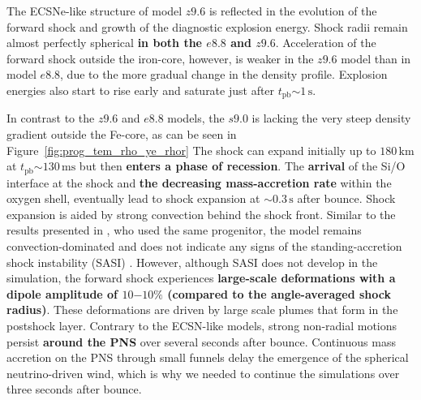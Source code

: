 \documentclass[fleqn,usenatbib]{mnras}
\newcommand{\tpb}{\ensuremath{t_{\text{pb}}}}
\newcommand{\km}{\ensuremath{\mathrm{km}}}
\newcommand{\s}{\ensuremath{\text{s}}}
\newcommand{\ms}{\ensuremath{\text{ms}}}
\begin{document}
The ECSNe-like structure of model $z9.6$ is reflected in the evolution of the forward shock and growth of the diagnostic explosion energy. Shock radii remain almost perfectly spherical \textbf{in both the $e8.8$ and $z9.6$}. Acceleration of the forward shock outside the iron-core, however, is weaker in the $z9.6$ model than in model $e8.8$, due to the more gradual change in the density profile. Explosion energies also start to rise early and saturate just after $\tpb\mathord{\sim}1\,\s$.

In contrast to the $z9.6$ and $e8.8$ models, the $s9.0$ is lacking the very steep density gradient outside the Fe-core, as can be seen in Figure~\ref{fig:prog_tem_rho_ye_rhor}
The shock can expand initially up to $180\,\km$ at $\tpb\mathord{\sim}130\,\ms$ but then \textbf{enters a phase of recession}. The \textbf{arrival} of the Si/O interface at the shock and \textbf{the decreasing mass-accretion rate} within the oxygen shell, eventually lead to shock expansion at $\mathord{\sim}0.3\,\s$ after bounce. Shock expansion is aided by strong convection behind the shock front. Similar to the results presented in \cite{Glas2019}, who used the same progenitor, the model remains convection-dominated and does not indicate any signs of the standing-accretion shock instability (SASI) \citep{Blondin2003,Foglizzo2007}.
However, although SASI does not develop in the simulation, the forward shock experiences \textbf{large-scale deformations with a dipole amplitude of $10\mathord{-}10\%$ (compared to the angle-averaged shock radius)}. These deformations are driven by large scale plumes that form in the postshock layer. 
Contrary to the ECSN-like models, strong non-radial motions persist \textbf{around the PNS} over several seconds after bounce. Continuous mass accretion on the PNS through small funnels delay the emergence of the spherical neutrino-driven wind, which is why we needed to continue the simulations over three seconds after bounce.
\end{document}
